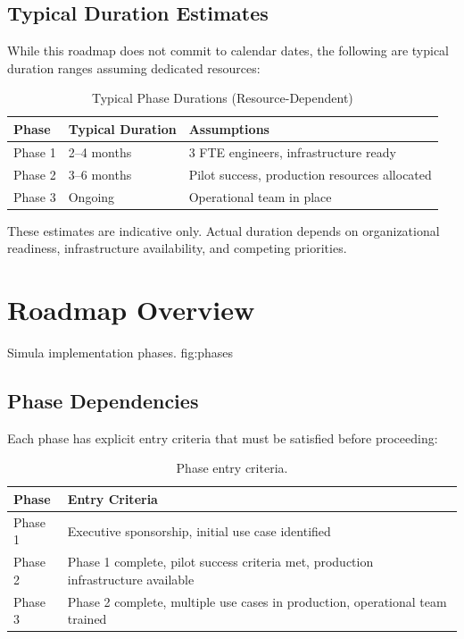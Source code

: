\subsection*{Typical Duration Estimates}

While this roadmap does not commit to calendar dates, the following are typical
duration ranges assuming dedicated resources:

\begin{table}[htbp]
\centering
\caption{Typical Phase Durations (Resource-Dependent)}
\label{tab:typical-durations}
\footnotesize
\begin{tabular}{@{}l l l@{}}
\toprule
\textbf{Phase} & \textbf{Typical Duration} & \textbf{Assumptions} \\
\midrule
Phase 1 & 2--4 months & 3 FTE engineers, infrastructure ready \\
Phase 2 & 3--6 months & Pilot success, production resources allocated \\
Phase 3 & Ongoing & Operational team in place \\
\bottomrule
\end{tabular}
\end{table}

\noindent
These estimates are indicative only. Actual duration depends on organizational
readiness, infrastructure availability, and competing priorities.

\section{Roadmap Overview}

%
  {Simula implementation phases.}%
  {fig:phases}

\subsection{Phase Dependencies}

Each phase has explicit entry criteria that must be satisfied before proceeding:

\begin{table}[htbp]
\centering
\caption{Phase entry criteria.}
\label{tab:phase-entry}
\footnotesize
\begin{tabularx}{\textwidth}{@{}l X@{}}
\toprule
\textbf{Phase} & \textbf{Entry Criteria} \\
\midrule
Phase 1 & Executive sponsorship, initial use case identified \\
Phase 2 & Phase 1 complete, pilot success criteria met, production infrastructure available \\
Phase 3 & Phase 2 complete, multiple use cases in production, operational team trained \\
\bottomrule
\end{tabularx}
\end{table}


